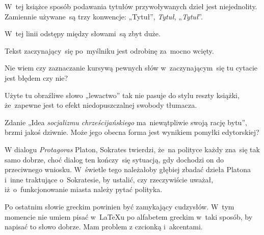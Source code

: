 \documentclass[a4paper,11pt]{article}
\begin{document}
{}



\start W~tej książce sposób podawania tytułów przywoływanych dzieł
jest niejednolity. Zamiennie używane~są trzy konwencje: „Tytuł”,
\emph{Tytuł}, „\emph{Tytuł}”.

\vspace{\spaceFour}


\start {} W~tej linii odstępy między słowami~są zbyt
duże.

\vspace{\spaceFour}


\start {} Tekst zaczynający~się po~myślniku jest odrobinę
za~mocno wcięty.

\vspace{\spaceFour}


\start {} Nie wiem czy zaznaczanie kursywą pewnych słów
w~zaczynającym~się tu cytacie jest błędem czy nie?

\vspace{\spaceFour}


\start {} Użyte tu obraźliwe słowo „lewactwo” tak nie
pasuje do stylu reszty książki, że~zapewne jest to efekt
niedopuszczalnej swobody tłumacza.

\vspace{\spaceFour}


\start {} Zdanie „Idea \emph{socjalizmu
  chrześcijańskiego} ma~niewątpliwie swoją rację bytu”, brzmi jakoś
dziwnie. Może jego obecna forma jest wynikiem pomyłki edytorskiej?

\vspace{\spaceFour}


\start {} W dialogu \emph{Protagoras} Platon, Sokrates
twierdzi, że~na polityce każdy zna~się tak samo dobrze, choć dialog
ten kończy~się sytuacją, gdy dochodzi on do przeciwnego wniosku.
W~świetle tego należałoby głębiej zbadać dzieła Platona i~inne
traktujące o~Sokratesie, by ustalić, czy rzeczywiście uważał,
iż~o~funkcjonowanie miasta należy pytać polityka.

\vspace{\spaceFour}


\start {} Po ostatnim słowie greckim powinien być
zamykający cudzysłów. W~tym momencie nie umiem pisać w~\LaTeX u po
alfabetem greckim w~taki sposób, by napisać to słowo dobrze. Mam
problem z czcionką i~akcentami.
\end{document}
